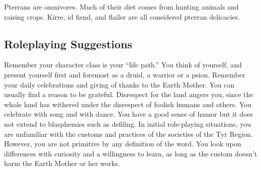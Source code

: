 Pterrans are omnivores. Much of their diet comes from hunting animals and raising crops. Kirre, id fiend, and flailer are all considered pterran delicacies.

\subsection{Roleplaying Suggestions}
Remember your character class is your ``life path.'' You think of yourself, and present yourself first and foremost as a druid, a warrior or a psion. Remember your daily celebrations and giving of thanks to the Earth Mother. You can usually find a reason to be grateful. Disrespect for the land angers you, since the whole land has withered under the disrespect of foolish humans and others. You celebrate with song and with dance. You have a good sense of humor but it does not extend to blasphemies such as defiling. In initial role-playing situations, you are unfamiliar with the customs and practices of the societies of the Tyr Region. However, you are not primitive by any definition of the word. You look upon differences with curiosity and a willingness to learn, as long as the custom doesn't harm the Earth Mother or her works.

